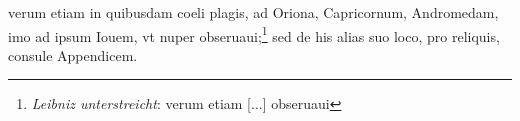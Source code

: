 \pend \pstart [p.~175] [...] verum etiam in quibusdam coeli  plagis, ad Oriona\protect{}, Capricornum\protect{}, Andromedam\protect{}, imo  ad ipsum Iouem\protect{}, vt nuper obseruaui;\footnote{\textit{Leibniz unterstreicht}: verum etiam [...] obseruaui} sed de his alias  suo loco, pro reliquis, consule Appendicem.